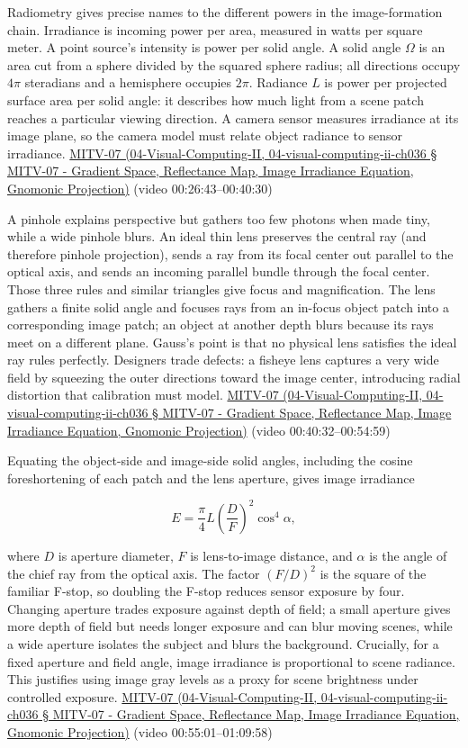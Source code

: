 Radiometry gives precise names to the different powers in the image-formation chain. Irradiance is incoming power per area, measured in watts per square meter. A point source's intensity is power per solid angle. A solid angle \(\Omega\) is an area cut from a sphere divided by the squared sphere radius; all directions occupy \(4\pi\) steradians and a hemisphere occupies \(2\pi\). Radiance \(L\) is power per projected surface area per solid angle: it describes how much light from a scene patch reaches a particular viewing direction. A camera sensor measures irradiance at its image plane, so the camera model must relate object radiance to sensor irradiance. \href{}{MITV-07 (04-Visual-Computing-II, 04-visual-computing-ii-ch036 § MITV-07 - Gradient Space, Reflectance Map, Image Irradiance Equation, Gnomonic Projection)} (video 00:26:43--00:40:30)

A pinhole explains perspective but gathers too few photons when made tiny, while a wide pinhole blurs. An ideal thin lens preserves the central ray (and therefore pinhole projection), sends a ray from its focal center out parallel to the optical axis, and sends an incoming parallel bundle through the focal center. Those three rules and similar triangles give focus and magnification. The lens gathers a finite solid angle and focuses rays from an in-focus object patch into a corresponding image patch; an object at another depth blurs because its rays meet on a different plane. Gauss's point is that no physical lens satisfies the ideal ray rules perfectly. Designers trade defects: a fisheye lens captures a very wide field by squeezing the outer directions toward the image center, introducing radial distortion that calibration must model. \href{}{MITV-07 (04-Visual-Computing-II, 04-visual-computing-ii-ch036 § MITV-07 - Gradient Space, Reflectance Map, Image Irradiance Equation, Gnomonic Projection)} (video 00:40:32--00:54:59)

Equating the object-side and image-side solid angles, including the cosine foreshortening of each patch and the lens aperture, gives image irradiance

\[
E=\frac{\pi}{4}L\left(\frac{D}{F}\right)^2\cos^4\alpha,
\]

where \(D\) is aperture diameter, \(F\) is lens-to-image distance, and \(\alpha\) is the angle of the chief ray from the optical axis. The factor \((F/D)^2\) is the square of the familiar F-stop, so doubling the F-stop reduces sensor exposure by four. Changing aperture trades exposure against depth of field; a small aperture gives more depth of field but needs longer exposure and can blur moving scenes, while a wide aperture isolates the subject and blurs the background. Crucially, for a fixed aperture and field angle, image irradiance is proportional to scene radiance. This justifies using image gray levels as a proxy for scene brightness under controlled exposure. \href{}{MITV-07 (04-Visual-Computing-II, 04-visual-computing-ii-ch036 § MITV-07 - Gradient Space, Reflectance Map, Image Irradiance Equation, Gnomonic Projection)} (video 00:55:01--01:09:58)

